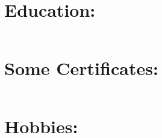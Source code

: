 \documentclass[a4paper,10pt]{article}
\begin{document}
\section*{Education:}
\begin{tabular}{r|p{11cm}}
\end{tabular}
\section*{Some Certificates:}
\begin{tabular}{r|p{11cm}}
\end{tabular}
\section*{Hobbies:}
\begin{tabular}{r|p{11cm}}
\end{tabular}
\end{document}
